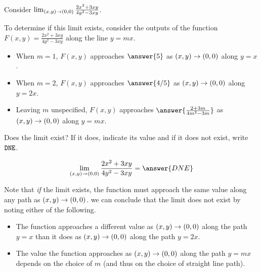 \documentclass{ximera}
\author{Jim Talamo \and Bart Snapp}
\begin{document}
\begin{exercise}

Consider $ \lim_{\left(x,y\right)\to \left(0,0\right)}\frac{2x^2+3 x y}{4y^2-3xy}$.
    
    To determine if this limit exists, consider the outputs of the function $F(x,y) = \frac{2x^2+3 x y}{4y^2-3xy}$ along the line $y = m x$.
    \begin{itemize}
    \item When $m = 1$, $F(x,y)$ approaches $\answer{5}$ as $\left(x,y\right) \to \left(0,0\right)$ along $y= x$.
    \item When $m = 2$, $F(x,y)$ approaches  $\answer{4/5}$  as $\left(x,y\right) \to \left(0,0\right)$ along $y= 2 x$.
    \item Leaving $m$ unspecified, $F(x,y)$ approaches  $\answer{\frac{2+3m}{4m^2-3m}}$  as $\left(x,y\right) \to \left(0,0\right)$ along $y= m x$.
    \end{itemize}
  
\begin{exercise}  
  Does the limit exist? If it does, indicate its value and if it does not exist, write $\verb|DNE|$.

  \[
  \lim_{\point{x,y}\to \point{0,0}}\frac{2x^2+3 x y}{4y^2-3xy} = \answer{DNE}
  \]
  
  \begin{feedback}[correct]
  Note that \emph{if} the limit exists, the function must approach the same value along any path as $\left(x,y\right) \to \left(0,0\right)$.  we can conclude that the limit does not exist by noting either of the following.
  
  \begin{itemize}
  \item The function approaches a different value as $\left(x,y\right) \to \left(0,0\right)$ along the path $y=x$ than it does as $\left(x,y\right) \to \left(0,0\right)$ along the path $y=2x$.
  \item The value the function approaches as $\left(x,y\right) \to \left(0,0\right)$ along the path $y=mx$ depends on the choice of $m$ (and thus on the choice of straight line path).
  \end{itemize}
  \end{feedback}
 \end{exercise}
\end{exercise}
\end{document}
